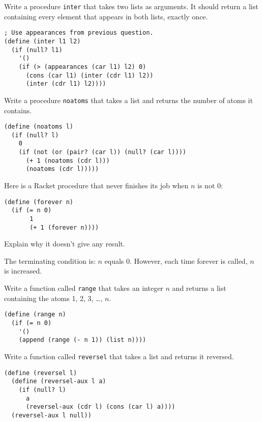 \documentclass[addpoints,12pt,a4paper]{exam}
\begin{document}
\begin{questions}
\question
Write a procedure \texttt{inter} that takes two lists as arguments.
It should return a list containing every element that appears in both lists, exactly once.

\begin{solution}
  \begin{verbatim}
; Use appearances from previous question.
(define (inter l1 l2)
  (if (null? l1)
    '()
    (if (> (appearances (car l1) l2) 0)
      (cons (car l1) (inter (cdr l1) l2))
      (inter (cdr l1) l2))))
  \end{verbatim}
\end{solution}

\question
Write a procedure \texttt{noatoms} that takes a list and returns the number of atoms it contains.

\begin{solution}
  \begin{verbatim}
(define (noatoms l)
  (if (null? l)
    0
    (if (not (or (pair? (car l)) (null? (car l))))
      (+ 1 (noatoms (cdr l)))
      (noatoms (cdr l)))))
  \end{verbatim}
\end{solution}

\question
Here is a Racket procedure that never finishes its job when $n$ is not $0$:
\begin{verbatim}
(define (forever n)
  (if (= n 0)
       1
       (+ 1 (forever n))))
\end{verbatim}
Explain why it doesn’t give any result\cite{simplyscheme}.

\begin{solution}
The terminating condition is: $n$ equals 0.
However, each time forever is called, $n$ is increased.
\end{solution}

\question
Write a function called \texttt{range} that takes an integer $n$ and returns a list containing the atoms 1, 2, 3, \ldots, $n$.

\begin{solution}
\begin{verbatim}
(define (range n)
  (if (= n 0)
    '()
    (append (range (- n 1)) (list n))))
\end{verbatim}
\end{solution}

\question
Write a function called \texttt{reversel} that takes a list and returns it reversed.  

\begin{solution}
\begin{verbatim}
(define (reversel l)
  (define (reversel-aux l a)
    (if (null? l)
      a
      (reversel-aux (cdr l) (cons (car l) a))))
  (reversel-aux l null))
\end{verbatim}
\end{solution}


\end{questions}
\end{document}
